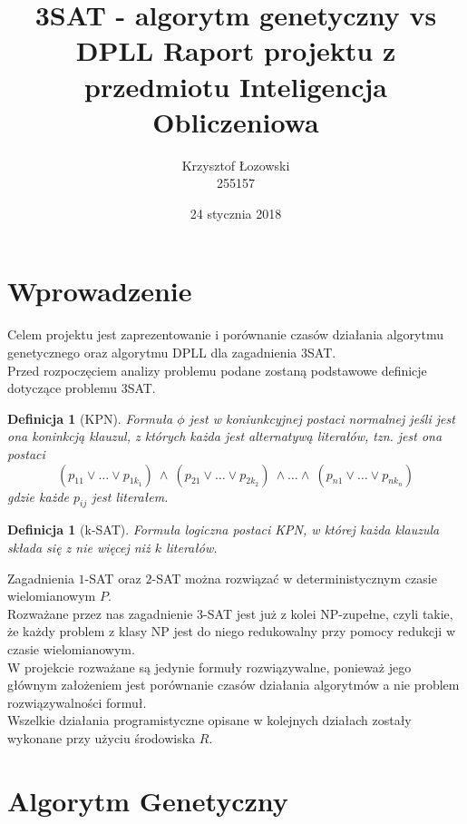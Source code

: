 \documentclass[11pt]{article}
\title{\textbf{3SAT - algorytm genetyczny vs DPLL}
\large Raport projektu z przedmiotu Inteligencja Obliczeniowa}
\author{Krzysztof Łozowski \\ 255157}
\date{24 stycznia 2018}
\theoremstyle{note}
\newtheorem{definition}[theorem]{Definicja}
\begin{document}
\maketitle

\section{Wprowadzenie}

Celem projektu jest zaprezentowanie i porównanie czasów działania algorytmu genetycznego oraz algorytmu DPLL dla zagadnienia 3SAT. \\
Przed rozpoczęciem analizy problemu podane zostaną podstawowe definicje dotyczące problemu 3SAT.

\begin{definition}[KPN]
Formuła $\phi$ jest w koniunkcyjnej postaci normalnej jeśli jest ona koninkcją klauzul, z których każda jest alternatywą literałów, tzn. jest ona postaci
  \begin{displaymath}
    (p_{11} \vee \ldots \vee p_{1k_{1}}) \ \wedge \ (p_{21} \vee \ldots \vee p_{2k_{2}}) \ \wedge \ldots \wedge \ (p_{n1} \vee \ldots \vee p_{nk_{n}})
  \end{displaymath}
gdzie każde $p_{ij}$ jest literałem.
\end{definition}

\begin{definition}[k-SAT]
  Formuła logiczna postaci KPN, w której każda klauzula składa się z nie więcej niż $k$ literałów.
\end{definition}

Zagadnienia $1$-SAT oraz $2$-SAT można rozwiązać w deterministycznym czasie wielomianowym $P$. \\
Rozważane przez nas zagadnienie $3$-SAT jest już z kolei NP-zupełne, czyli takie, że każdy problem z klasy NP jest do niego redukowalny przy pomocy redukcji w czasie wielomianowym. \\
W projekcie rozważane są jedynie formuły rozwiązywalne, ponieważ jego głównym założeniem jest porównanie czasów działania algorytmów a nie problem rozwiązywalności formuł. \\

Wszelkie działania programistyczne opisane w kolejnych działach zostały wykonane przy użyciu środowiska $R$.

\newpage
\section{Algorytm Genetyczny}
\end{document}
